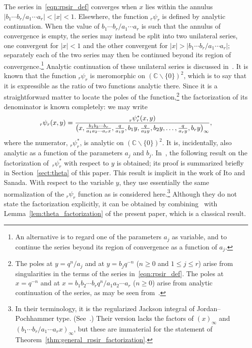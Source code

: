 \documentclass[10pt,a4paper]{amsart}
\numberwithin{equation}{section}
\newcommand{\C}{\mathbb{C}}
\begin{document}
The series in~\eqref{eqn:rpsir_def} converges when $x$ lies within the annulus $|b_1\cdots b_r/a_1\cdots a_r|<|x|<1$. Elsewhere, the function $_r\psi_r$ is defined by analytic continuation. When the value of $b_1\cdots b_r/a_1\cdots a_r$ is such that the annulus of convergence is empty, the series may instead be split into two unilateral series, one convergent for $|x|<1$ and the other convergent for $|x|>|b_1\cdots b_r/a_1\cdots a_r|$; separately each of the two series may then be continued beyond its region of convergence.\footnote{An alternative is to regard one of the parameters $a_j$ as variable, and to continue the series beyond its region of convergence as a function of $a_j$.} Analytic continuation of these unilateral series is discussed in~\cite[Section~4.5]{Gasper2004}. It is known that the function $_r\psi_r$ is meromorphic on $(\C \backslash \{0\})^2$, which is to say that it is expressible as the ratio of two functions analytic there. Since it is a straightforward matter to locate the poles of the function,\footnote{The poles at $y=q^n/a_j$ and at $y=b_j q^{-n}$ ($n \geq 0$ and $1 \leq j \leq r$) arise from singularities in the terms of the series in~\eqref{eqn:rpsir_def}. The poles at $x=q^{-n}$ and at $x = b_1 b_2 \cdots b_r q^n /a_1 a_2 \cdots a_r$ ($n \geq 0$) arise from analytic continuation of the series, as may be seen from~\cite[equation~(4.5.2)]{Gasper2004}.} the factorization of its denominator is known completely: we may write
\[ _r\psi_r(x,y) = {_r^{}\psi_r^\ast(x,y) \over \bigl(x,{b_1 b_2 \cdots b_r \over a_1 a_2 \cdots a_r x},{q \over a_1y},b_1y,{q \over a_2y},b_2y,\dots,{q \over a_ry},b_ry\bigr)_{ \infty}}, \]
where the numerator, $_r^{}\psi_r^\ast$, is analytic on $(\C \backslash \{0\})^2$. It is, incidentally, also analytic as a function of the parameters $a_j$ and $b_j$. In~\cite[Section~3.4]{Bradley-Thrush2023}, the following result on the factorization of~$_r^{}\psi_r^\ast$ with respect to $y$ is obtained; its proof is summarized briefly in Section~\ref{sect:theta} of this paper. This result is implicit in the work of Ito and Sanada. With respect to the variable $y$, they use essentially the same normalization of the $_r\psi_r$ function as is considered here.\footnote{In their terminology, it is the regularized Jackson integral of Jordan--Pochhammer type. (See~\cite[Sections~2.3 and~5.1]{Ito2008}.) Their version lacks the factors of $(x)_\infty$ and $(b_1 \cdots b_r/a_1 \cdots a_r x)_\infty$, but these are immaterial for the statement of Theorem~\ref{thm:general_rpsir_factorization}.} Although they do not state the factorization explicitly, it can be obtained by combining~\cite[Lemma~5.5]{Ito2008} with Lemma~\ref{lem:theta_factorization} of the present paper, which is a classical result.
\end{document}
